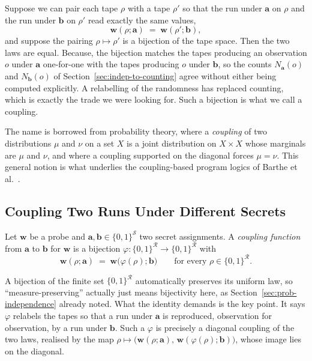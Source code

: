 Suppose we can pair each tape $\rho$ with a tape $\rho'$ so that the run under
$\mathbf{a}$ on $\rho$ and the run under $\mathbf{b}$ on $\rho'$ read exactly the
same values,
\[
  \mathbf{w}(\rho; \mathbf{a}) \;=\; \mathbf{w}(\rho'; \mathbf{b}) ,
\]
and suppose the pairing $\rho \mapsto \rho'$ is a bijection of the tape space. Then
the two laws are equal. Because, the bijection matches
the tapes producing an observation $o$ under $\mathbf{a}$ one-for-one with the tapes
producing $o$ under $\mathbf{b}$, so the counts $N_{\mathbf{a}}(o)$ and
$N_{\mathbf{b}}(o)$ of Section~\ref{sec:indep-to-counting} agree without either
being computed explicitly. A relabelling of the randomness has replaced counting, which is
exactly the trade we were looking for. Such a bijection is what we call a coupling.

The name is borrowed from probability theory, where a \emph{coupling} of two
distributions $\mu$ and $\nu$ on a set $X$ is a joint distribution on
$X \times X$ whose marginals are $\mu$ and $\nu$, and where a coupling supported on
the diagonal forces $\mu = \nu$. This general notion is what underlies the coupling-based
program logics of Barthe et al.\ \parencite{barthe2017coupling}.

  \subsection{Coupling Two Runs Under Different Secrets}
  \label{sec:coupling-two-runs}

  \begin{definition}
  \label{def:coupling-function}
  Let $\mathbf{w}$ be a probe and $\mathbf{a}, \mathbf{b} \in \{0,1\}^{\mathcal{S}}$ two
  secret assignments. A \emph{coupling function} from $\mathbf{a}$ to $\mathbf{b}$
  for $\mathbf{w}$ is a bijection $\varphi : \{0,1\}^{\mathcal{R}} \to \{0,1\}^{\mathcal{R}}$
  with
  \[
    \mathbf{w}(\rho; \mathbf{a}) \;=\; \mathbf{w}\big(\varphi(\rho); \mathbf{b}\big)
    \qquad \text{for every } \rho \in \{0,1\}^{\mathcal{R}} .
  \]
  \end{definition}

  A bijection of the finite set $\{0,1\}^{\mathcal{R}}$ automatically preserves its
  uniform law, so ``measure-preserving'' actually just means bijectivity here, as
  Section~\ref{sec:prob-independence} already noted. What
  the identity demands is the key point. It says $\varphi$ relabels the tapes so
  that a run under $\mathbf{a}$ is reproduced, observation for observation, by a
  run under $\mathbf{b}$. Such a $\varphi$ is precisely a diagonal coupling of the
  two laws, realised by the map $\rho \mapsto \big(\mathbf{w}(\rho; \mathbf{a}),\,
  \mathbf{w}(\varphi(\rho); \mathbf{b})\big)$, whose image lies on the diagonal.

